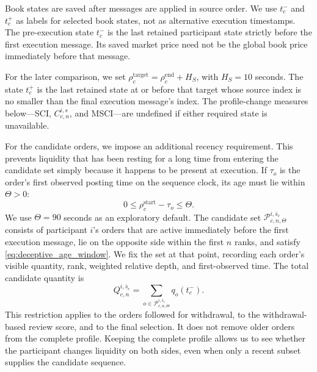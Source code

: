 \documentclass[11pt]{article}
\begin{document}
Book states are saved after messages are applied in source order. We use $t_c^{-}$ and $t_c^{+}$ as labels for selected book states, not as alternative execution timestamps. The pre-execution state $t_c^{-}$ is the last retained participant state strictly before the first execution message. Its saved market price need not be the global book price immediately before that message.

For the later comparison, we set $\rho_c^{\mathrm{target}}=\rho_c^{\mathrm{end}}+H_S$, with $H_S=10$ seconds. The state $t_c^{+}$ is the last retained state at or before that target whose source index is no smaller than the final execution message's index. The profile-change measures below---SCI, $C^{i,s}_{c,n}$, and MSCI---are undefined if either required state is unavailable.

For the candidate orders, we impose an additional recency requirement. This prevents liquidity that has been resting
for a long time from entering the candidate set simply because it happens to be present at execution.
If $\tau_o$ is the order's first observed posting time on the sequence clock, its age must lie within $\Theta>0$:
\begin{equation}
    0 \leq \rho_c^{\mathrm{start}}-\tau_o \leq \Theta .
    \label{eq:deceptive_age_window}
\end{equation}
We use $\Theta=90$ seconds as an exploratory default. The candidate set $\mathcal{P}^{i,\bar{s}_c}_{c,n,\Theta}$ consists
of participant $i$'s orders that are active immediately before the first execution message, lie on the opposite side
within the first $n$ ranks, and satisfy \cref{eq:deceptive_age_window}. We fix the set at that point, recording each
order's visible quantity, rank, weighted relative depth, and first-observed time. The total candidate quantity is
\begin{equation}
    Q^{i,\bar{s}_c}_{c,n}
    =
    \sum_{o\in\mathcal{P}^{i,\bar{s}_c}_{c,n,\Theta}} q_o(t_c^{-}).
    \label{eq:age_conditioned_candidate_quantity}
\end{equation}
This restriction applies to the orders followed for withdrawal, to the withdrawal-based review score, and to the final
selection. It does not remove older orders from the complete profile. Keeping the complete profile allows us to see
whether the participant changes liquidity on both sides, even when only a recent subset supplies the candidate sequence.
\end{document}
